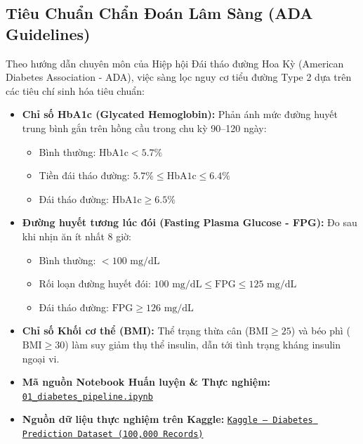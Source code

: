 \documentclass[12pt,a4paper]{report}
\begin{document}
\subsection{Tiêu Chuẩn Chẩn Đoán Lâm Sàng (ADA Guidelines)}
Theo hướng dẫn chuyên môn của Hiệp hội Đái tháo đường Hoa Kỳ (American Diabetes Association - ADA), việc sàng lọc nguy cơ tiểu đường Type 2 dựa trên các tiêu chí sinh hóa tiêu chuẩn:
\begin{itemize}[leftmargin=2em]
    \item \textbf{Chỉ số HbA1c (Glycated Hemoglobin):} Phản ánh mức đường huyết trung bình gắn trên hồng cầu trong chu kỳ 90--120 ngày:
    \begin{itemize}
        \item Bình thường: $\text{HbA1c} < 5.7\%$
        \item Tiền đái tháo đường: $5.7\% \le \text{HbA1c} \le 6.4\%$
        \item Đái tháo đường: $\text{HbA1c} \ge 6.5\%$
    \end{itemize}
    \item \textbf{Đường huyết tương lúc đói (Fasting Plasma Glucose - FPG):} Đo sau khi nhịn ăn ít nhất 8 giờ:
    \begin{itemize}
        \item Bình thường: $< 100\text{ mg/dL}$
        \item Rối loạn đường huyết đói: $100\text{ mg/dL} \le \text{FPG} \le 125\text{ mg/dL}$
        \item Đái tháo đường: $\text{FPG} \ge 126\text{ mg/dL}$
    \end{itemize}
    \item \textbf{Chỉ số Khối cơ thể (BMI):} Thể trạng thừa cân ($\text{BMI} \ge 25$) và béo phì ($\text{BMI} \ge 30$) làm suy giảm thụ thể insulin, dẫn tới tình trạng kháng insulin ngoại vi.
\end{itemize}

\begin{itemize}[leftmargin=1.5em, itemsep=2pt]
    \item \textbf{Mã nguồn Notebook Huấn luyện \& Thực nghiệm:} \href{https://github.com/phamtu2x5/INTELLIGENT-SYSTEM-DEVELOPMENT/blob/main/src/Assigment%2002/diabetes/notebook/01_diabetes_pipeline.ipynb}{\texttt{01\_diabetes\_pipeline.ipynb}}
    \item \textbf{Nguồn dữ liệu thực nghiệm trên Kaggle:} \href{https://www.kaggle.com/datasets/iammustafatz/diabetes-prediction-dataset}{\texttt{Kaggle -- Diabetes Prediction Dataset (100,000 Records)}}
\end{itemize}
\end{document}
